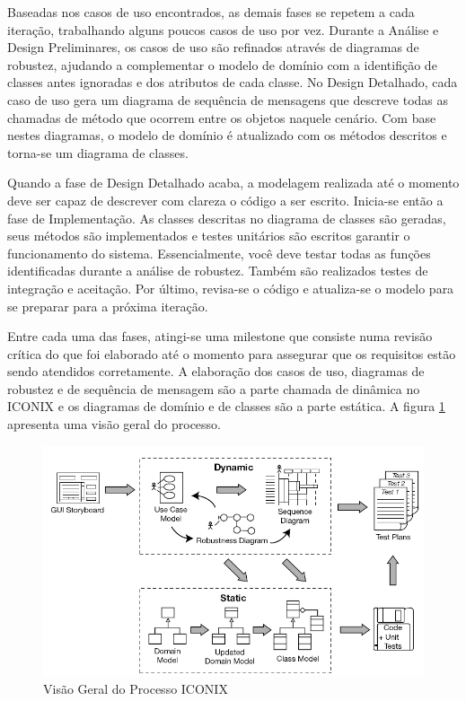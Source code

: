 \documentclass[
	12pt,				%
	openright,			%
	oneside,			%
	a4paper,			%
	english,			%
	spanish,			%
	brazil				%
	]{abntex2}
\begin{document}
	Baseadas nos casos de uso encontrados, as demais fases se repetem a cada iteração, trabalhando alguns poucos casos de uso por vez. Durante a Análise e Design Preliminares, os casos de uso são refinados através de diagramas de robustez, ajudando a complementar o modelo de domínio com a identifição de classes antes ignoradas e dos atributos de cada classe. No Design Detalhado, cada caso de uso gera um diagrama de sequência de mensagens que descreve todas as chamadas de método que ocorrem entre os objetos naquele cenário. Com base nestes diagramas, o modelo de domínio é atualizado com os métodos descritos e torna-se um diagrama de classes.
	
	Quando a fase de Design Detalhado acaba, a modelagem realizada até o momento deve ser capaz de descrever com clareza o código a ser escrito. Inicia-se então a fase de Implementação. As classes descritas no diagrama de classes são geradas, seus métodos são implementados e testes unitários são escritos garantir o funcionamento do sistema. Essencialmente, você deve testar todas as funções identificadas durante a análise de robustez. \cite{iconix} Também são realizados testes de integração e aceitação. Por último, revisa-se o código e atualiza-se o modelo para se preparar para a próxima iteração.  
	
	Entre cada uma das fases, atingi-se uma milestone que consiste numa revisão crítica do que foi elaborado até o momento para assegurar que os requisitos estão sendo atendidos corretamente. A elaboração dos casos de uso, diagramas de robustez e de sequência de mensagem são a parte chamada de dinâmica no ICONIX e os diagramas de domínio e de classes são a parte estática. A figura \ref{iconix_diagram} apresenta uma visão geral do processo.
	
\begin{figure}[!htb]
\centering
\includegraphics[scale=0.5]{iconix}
\caption{Visão Geral do Processo ICONIX \cite{iconix}}
\label{iconix_diagram}
\end{figure}
\end{document}
